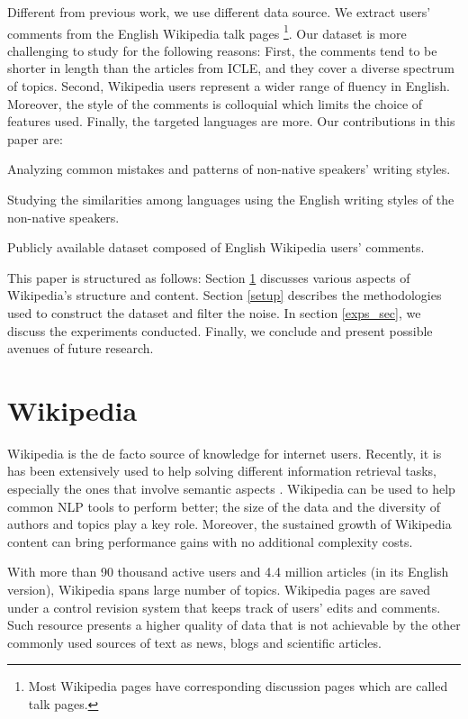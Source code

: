 \documentclass[10pt,a5paper,twoside]{article}
\begin{document}
Different from previous work, we use different data source. We extract users'
comments from the English Wikipedia talk pages \footnote{Most Wikipedia pages
have corresponding discussion pages which are called talk pages.}. Our dataset is more challenging to study for the following reasons:
First, the comments tend to be shorter in length than the articles from ICLE,
and they cover a diverse spectrum of topics.
Second, Wikipedia users represent a wider
range of fluency in English. Moreover, the
style of the comments is colloquial which limits the choice of features used.
Finally, the targeted languages are more. 
Our contributions in this paper are:
\begin{compactitem}
\item Analyzing common mistakes and patterns of non-native
speakers' writing styles.
\item Studying the similarities among languages using the English writing
styles of the non-native speakers.
\item Publicly available dataset composed of English Wikipedia users' comments.
\end{compactitem}

This paper is structured as follows: Section \ref{wiki} discusses various
aspects of Wikipedia's structure and content. Section \ref{setup} describes
the methodologies used to construct the dataset and filter the noise. In section
\ref{exps_sec}, we discuss the experiments conducted.
Finally, we conclude and present possible avenues of future research.

\section{Wikipedia}
\label{wiki}
Wikipedia is the de facto source of knowledge for internet users. Recently, it
is has been extensively used to help solving different information retrieval
tasks, especially the ones that involve semantic aspects \cite{Milne08aneffective}.
Wikipedia can be used to help
 common NLP tools to perform better; the size of the data and the diversity of
 authors and topics play a key role. Moreover, the sustained growth of Wikipedia
 content can bring performance gains with no additional complexity costs.

With more than 90 thousand active users and 4.4 million articles (in its English
version), Wikipedia spans large number of topics.
Wikipedia pages are saved under a control revision system that keeps track of
users' edits and comments.
Such resource presents a higher quality of data that is not achievable by the other commonly used sources of text as news, blogs and scientific articles.
\end{document}

